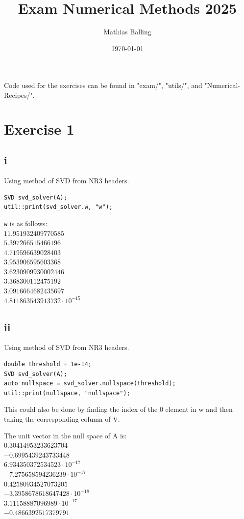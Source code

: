 \documentclass{article}
\title{Exam Numerical Methods 2025}
\author{Mathias Balling}
\date{\today}
\begin{document}
\maketitle

Code used for the exercises can be found in "exam/", "utils/", and "Numerical-Recipes/".
\section*{Exercise 1}
\subsection*{i}
Using method of SVD from NR3 headers.
\begin{verbatim}
SVD svd_solver(A);
util::print(svd_solver.w, "w");
\end{verbatim}

\texttt{w} is as follows:\\
$11.951932409770585$\\
$5.397266515466196$\\
$4.719596639028403$\\
$3.953906595603368$\\
$3.6230909930002446$\\
$3.368300112475192$\\
$3.0916664682435697$\\
$4.811863543913732\cdot 10^{-15}$

\subsection*{ii}
Using method of SVD from NR3 headers.
\begin{verbatim}
double threshold = 1e-14;
SVD svd_solver(A);
auto nullspace = svd_solver.nullspace(threshold);
util::print(nullspace, "nullspace");
\end{verbatim}
This could also be done by finding the index of the 0 element in w and then taking the corresponding column of V.

The unit vector in the null space of A is:\\
$0.30414953233623704$\\
$-0.6995439243733448 $\\
$6.934350372534523\cdot 10^{-17}$\\
  $-7.275658594236239\cdot 10^{-17}$\\
$0.42580934527073205$\\
$-3.3958678618647428\cdot 10^{-18}$\\
  $3.11158887096989\cdot 10^{-17}$\\
$-0.4866392517379791$\\
\end{document}

